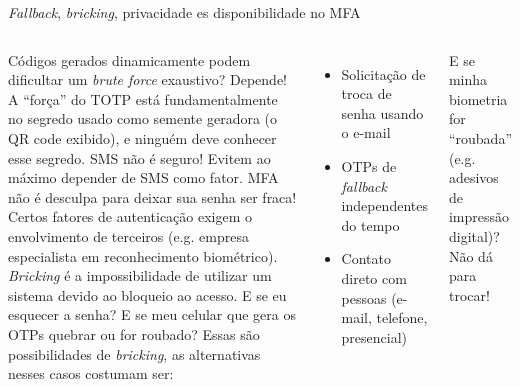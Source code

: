 \documentclass[utf8]{beamer}
\begin{document}
\begin{frame}{\emph{Fallback}, \emph{bricking},
              privacidade es disponibilidade no MFA}
  \fontsize{10pt}{10pt}\selectfont
  \begin{columns}[c]
    Códigos gerados dinamicamente
    podem dificultar um \emph{brute force} exaustivo?
    \vspace{.5em}\vfill
    Depende!
    A ``força'' do TOTP está fundamentalmente no segredo
    usado como semente geradora (o QR code exibido),
    e ninguém deve conhecer esse segredo.
    \vspace{.5em}\vfill
    SMS não é seguro! Evitem ao máximo depender de SMS como fator.
    \vspace{.5em}\vfill
    MFA não é desculpa para deixar sua senha ser fraca!
    \vspace{.5em}\vfill
    Certos fatores de autenticação
    exigem o envolvimento de terceiros
    (e.g. empresa especialista em reconhecimento biométrico).
    \emph{Bricking} é a impossibilidade de utilizar um sistema
    devido ao bloqueio ao acesso.
    \vspace{.5em}\vfill
    E se eu esquecer a senha?
    E se meu celular que gera os OTPs quebrar ou for roubado?
    Essas são possibilidades de \emph{bricking},
    as alternativas nesses casos costumam ser:
    \begin{itemize}
      \item Solicitação de troca de senha usando o e-mail
      \item OTPs de \emph{fallback} independentes do tempo
      \item Contato direto com pessoas (e-mail, telefone, presencial)
    \end{itemize}
    \vspace{.5em}\vfill
    E se minha biometria for ``roubada''
    (e.g. adesivos de impressão digital)?
    Não dá para trocar!
  \end{columns}
\end{frame}
\end{document}
